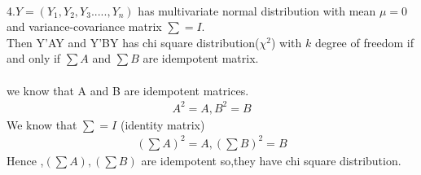 \documentclass[journal,12pt,twocolumn]{IEEEtran}
\begin{document}
 \\4.$Y=(Y_1,Y_2,Y_3.....,Y_n)$ has multivariate normal distribution with mean $\mu=0$ and variance-covariance matrix $\sum=I$.\\
 Then Y'AY and Y'BY has chi square distribution($\chi^2$) with $k$ degree of freedom if and only if $\sum A$ and $\sum B$ are idempotent matrix.\\
 \\we know that A and B are idempotent matrices.
  \begin{align}
 \tag{6}
 A^2=A ,B^2=B \label{eq:1} 
  \end{align}
  We know that $\sum=I$ (identity matrix)
  \begin{align}
 \tag{7}
 (\textstyle \sum  A)^2=A ,(\textstyle \sum B)^2=B \label{eq:1} 
  \end{align}
  Hence ,$(\sum  A),(\sum B)$ are idempotent so,they have chi square distribution.

 
\end{document}
